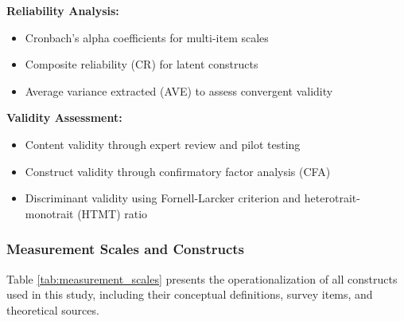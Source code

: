 \documentclass[../Main.tex]{subfiles}%
\begin{document}
	\textbf{Reliability Analysis:}
	\begin{itemize}
		\item Cronbach's alpha coefficients for multi-item scales
		\item Composite reliability (CR) for latent constructs
		\item Average variance extracted (AVE) to assess convergent validity
	\end{itemize}
	
	\textbf{Validity Assessment:}
	\begin{itemize}
		\item Content validity through expert review and pilot testing
		\item Construct validity through confirmatory factor analysis (CFA)
		\item Discriminant validity using Fornell-Larcker criterion and heterotrait-monotrait (HTMT) ratio
	\end{itemize}
	
	\subsubsection{Measurement Scales and Constructs}
	Table \ref{tab:measurement_scales} presents the operationalization of all constructs used in this study, including their conceptual definitions, survey items, and theoretical sources.
	
\end{document}
